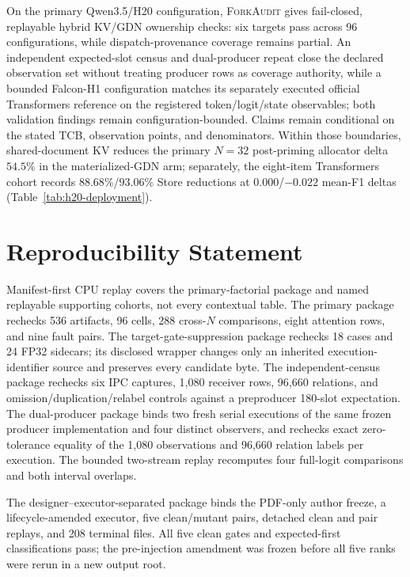 \documentclass{article}
\newcommand{\method}{\textsc{ForkAudit}}
\begin{document}
On the primary Qwen3.5/H20 configuration, \method{} gives fail-closed,
replayable hybrid KV/GDN ownership checks: six targets pass across 96
configurations, while dispatch-provenance coverage remains partial.  An independent
expected-slot census and dual-producer repeat close the declared observation
set without treating producer rows as coverage authority, while a bounded
Falcon-H1 configuration matches its separately executed official Transformers
reference on the registered
token/logit/state observables; both validation findings remain
configuration-bounded.  Claims remain conditional on the stated TCB,
observation points, and denominators.  Within those boundaries, shared-document
KV reduces the primary $N=32$ post-priming allocator delta $54.5\%$ in the
materialized-GDN arm; separately,
the eight-item Transformers cohort records $88.68\%$/$93.06\%$ Store reductions
at $0.000$/$-0.022$ mean-F1 deltas (Table~\ref{tab:h20-deployment}).




\appendix

\section{Reproducibility Statement}
\label{app:reproducibility}

Manifest-first CPU replay covers the primary-factorial package and named
replayable supporting cohorts, not every contextual table.  The primary package
rechecks 536 artifacts, 96 cells, 288 cross-$N$ comparisons, eight attention
rows, and nine fault pairs.  The target-gate-suppression package rechecks 18
cases and 24 FP32 sidecars; its disclosed wrapper changes only an inherited
execution-identifier source and preserves every candidate byte.  The
independent-census package rechecks six IPC captures, 1,080 receiver rows,
96,660 relations, and omission/duplication/relabel controls against a
preproducer 180-slot expectation.  The dual-producer package binds two fresh
serial executions of the same frozen producer implementation and four distinct
observers, and rechecks exact zero-tolerance equality of the 1,080 observations
and 96,660 relation labels per execution.  The
bounded two-stream replay recomputes four full-logit comparisons and both
interval overlaps.

The designer--executor-separated package binds the PDF-only author freeze, a
lifecycle-amended executor, five clean/mutant pairs, detached clean and pair
replays, and 208 terminal files.  All five clean gates and expected-first
classifications pass; the pre-injection amendment was frozen before all five
ranks were rerun in a new output root.
\end{document}
